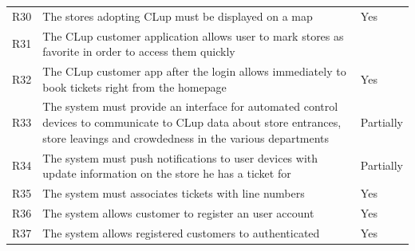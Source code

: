 \begin{tabular}{C{1cm}L{11cm}C{3.1cm}}
    R30   & The stores adopting CLup must be displayed on a map & Yes                                                                                                                            \\
    R31   & The CLup customer application allows user to mark stores as favorite in order to access them quickly                                                                            \\
    R32   & The CLup customer app after the login allows immediately to book tickets right from the homepage & Yes                                                                               \\
    R33   & The system must provide an interface for automated control devices to communicate to CLup data about store entrances, store leavings and crowdedness in the various departments & Partially\\
    R34   & The system must push notifications to user devices with update information on the store he has a ticket for   & Partially                                                                  \\
    R35  & The system must associates tickets with line numbers & Yes                                                                                                                           \\
    R36  & The system allows customer to register an user account & Yes \\
    R37  & The system allows registered customers to authenticated & Yes\\
\end{tabular}
\vfill
